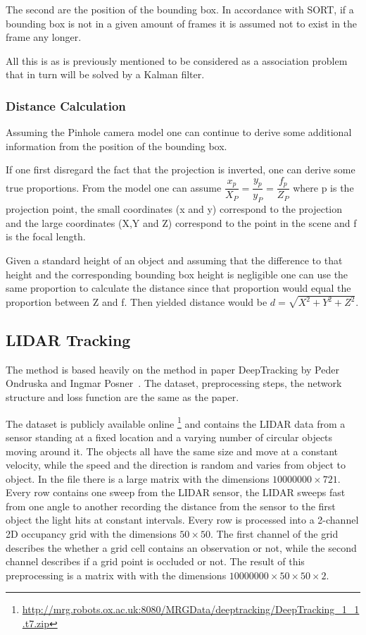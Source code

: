 \documentclass[a4paper]{article}
\begin{document}
The second are the position of the bounding box.
In accordance with SORT\cite{Bewley2016_sort}, if a bounding box is not in a given amount of frames it is assumed not to exist in the frame any longer.

All this is as is previously mentioned to be considered as a association problem that in turn will be solved by a Kalman filter.

\subsubsection{Distance Calculation} \label{sec:DC}

Assuming the Pinhole camera model\cite{Sturm2014} one can continue to derive some additional information from the position of the bounding box.

If one first disregard the fact that the projection is inverted, one can derive some true proportions.
From the model one can assume \(\dfrac{x_{p}}{X_P}=\dfrac{y_{p}}{y_P}=\dfrac{f_{p}}{Z_P}\) where p is the projection point, the small coordinates (x and y) correspond to the projection and the large coordinates (X,Y and Z) correspond to the point in the scene and f is the focal length.

Given a standard height of an object and assuming that the difference to that height and the corresponding bounding box height is negligible one can use the same proportion to calculate the distance since that proportion would equal the proportion between Z and f.
Then yielded distance would be \(d=\sqrt{X^2+Y^2+Z^2}\). 


\subsection{LIDAR Tracking}

The method is based heavily on the method in paper DeepTracking by Peder Ondruska and Ingmar Posner~\cite{DBLP:journals/corr/OndruskaP16}.
The dataset, preprocessing steps, the network structure and loss function are the same as the paper.

The dataset is publicly available online \footnote{\url{http://mrg.robots.ox.ac.uk:8080/MRGData/deeptracking/DeepTracking_1_1.t7.zip}} and contains the LIDAR data from a sensor standing at a fixed location and a varying number of circular objects moving around it.
The objects all have the same size and move at a constant velocity, while the speed and the direction is random and varies from object to object.
In the file there is a large matrix with the dimensions $10000000 \times 721$.
Every row contains one sweep from the LIDAR sensor, the LIDAR sweeps fast from one angle to another recording the distance from the sensor to the first object the light hits at constant intervals.
Every row is processed into a 2-channel 2D occupancy grid with the dimensions $50 \times 50$.
The first channel of the grid describes the whether a grid cell contains an observation or not, while the second channel describes if a grid point is occluded or not.
The result of this preprocessing is a matrix with with the dimensions $10000000 \times 50 \times 50 \times 2$.
\end{document}
